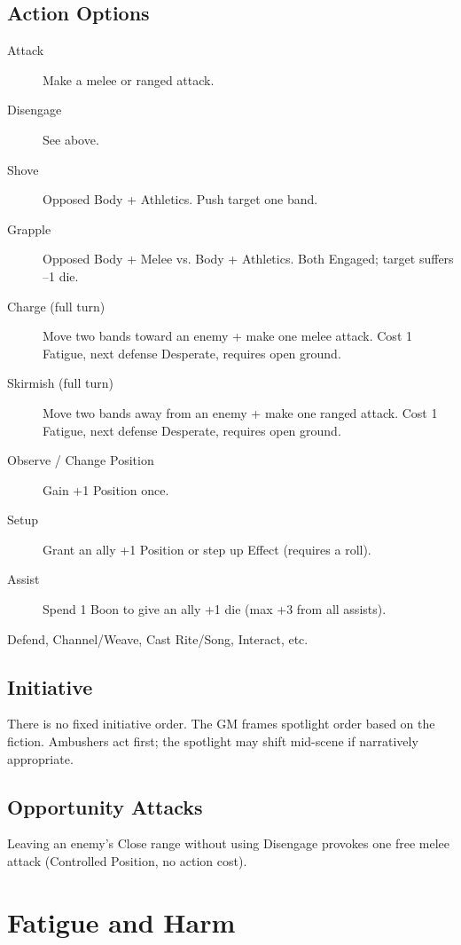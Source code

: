 \subsection{Action Options}
\begin{description}
    \item[Attack] Make a melee or ranged attack.
    \item[Disengage] See above.
    \item[Shove] Opposed Body + Athletics. Push target one band.
    \item[Grapple] Opposed Body + Melee vs. Body + Athletics. Both Engaged;
        target suffers --1 die.
    \item[Charge (full turn)] Move two bands toward an enemy + make one melee
        attack. Cost 1 Fatigue, next defense Desperate, requires open ground.
    \item[Skirmish (full turn)] Move two bands away from an enemy + make one
        ranged attack. Cost 1 Fatigue, next defense Desperate, requires open
        ground.
    \item[Observe / Change Position] Gain +1 Position once.
    \item[Setup] Grant an ally +1 Position or step up Effect (requires a roll).
    \item[Assist] Spend 1 Boon to give an ally +1 die (max +3 from all assists).
    \item[Defend, Channel/Weave, Cast Rite/Song, Interact, etc.]
\end{description}

\subsection{Initiative}
There is no fixed initiative order. The GM frames spotlight order based on the
fiction. Ambushers act first; the spotlight may shift mid-scene if narratively
appropriate.

\subsection{Opportunity Attacks}
Leaving an enemy's Close range without using Disengage provokes one free melee
attack (Controlled Position, no action cost).

\section{Fatigue and Harm}\label{sec:fatigue_harm}


